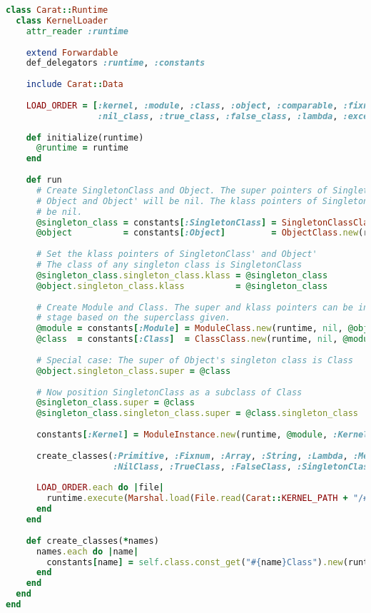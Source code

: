 \begin{lstlisting}[title={\small\ttfamily\bfseries runtime/kernel\_loader.rb},language=Ruby]
class Carat::Runtime
  class KernelLoader
    attr_reader :runtime
  
    extend Forwardable
    def_delegators :runtime, :constants
    
    include Carat::Data
    
    LOAD_ORDER = [:kernel, :module, :class, :object, :comparable, :fixnum, :array, :string,
                  :nil_class, :true_class, :false_class, :lambda, :exception]
    
    def initialize(runtime)
      @runtime = runtime
    end
    
    def run
      # Create SingletonClass and Object. The super pointers of SingletonClass, SingletonClass',
      # Object and Object' will be nil. The klass pointers of SingletonClass' and Object' will also
      # be nil.
      @singleton_class = constants[:SingletonClass] = SingletonClassClass.new(runtime, nil, nil)
      @object          = constants[:Object]         = ObjectClass.new(runtime, nil, nil)
      
      # Set the klass pointers of SingletonClass' and Object'
      # The class of any singleton class is SingletonClass
      @singleton_class.singleton_class.klass = @singleton_class
      @object.singleton_class.klass          = @singleton_class
      
      # Create Module and Class. The super and klass pointers can be inferred correctly at this 
      # stage based on the superclass given.
      @module = constants[:Module] = ModuleClass.new(runtime, nil, @object)
      @class  = constants[:Class]  = ClassClass.new(runtime, nil, @module)
      
      # Special case: The super of Object's singleton class is Class
      @object.singleton_class.super = @class
      
      # Now position SingletonClass as a subclass of Class
      @singleton_class.super = @class
      @singleton_class.singleton_class.super = @class.singleton_class
      
      constants[:Kernel] = ModuleInstance.new(runtime, @module, :Kernel)
      
      create_classes(:Primitive, :Fixnum, :Array, :String, :Lambda, :Method,
                     :NilClass, :TrueClass, :FalseClass, :SingletonClass)
      
      LOAD_ORDER.each do |file|
        runtime.execute(Marshal.load(File.read(Carat::KERNEL_PATH + "/#{file}.marshal")))
      end
    end
    
    def create_classes(*names)
      names.each do |name|
        constants[name] = self.class.const_get("#{name}Class").new(runtime, @class, @object)
      end
    end
  end
end

\end{lstlisting}
